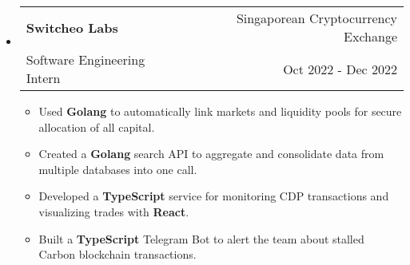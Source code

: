 \documentclass[letterpaper, 11pt]{article}
\makeatletter
\newcommand{\ResumeEntryTSDL}[4]{
  \vspace{1pt}\item
    \begin{tabular*}{\textwidth}[t]{l@{\extracolsep{\fill}}r} 
      \textbf{#1} & #2 \\
      #3 & #4 \\
    \end{tabular*}\vspace{-2.835pt} %
}
\newcommand{\ResumeItem}[2]{
  \item{
    \textbf{#1}{: #2 \vspace{-2.835pt}}
  }
}
\newcommand{\ResumeItemDefault}[1]{
  \item{
    #1 \vspace{-2.835pt}
  }
}
\newcommand{\ResumeEntryStart}{\begin{itemize}[leftmargin=0mm, label={}]}
\newcommand{\ResumeEntryEnd}{\end{itemize}\vspace{-2.835pt}} %
\newcommand{\ResumeItemListStart}{\begin{itemize}[leftmargin=5mm, label=$\bullet$, itemsep=1mm, parsep=1mm]} %
\newcommand{\ResumeItemListEnd}{\end{itemize}}
\makeatother
\begin{document}
  \ResumeEntryStart
    \ResumeEntryTSDL{Switcheo Labs}{Singaporean Cryptocurrency Exchange}{Software Engineering Intern}{Oct 2022 - Dec 2022}
    \ResumeItemListStart
    \ResumeItemDefault{Used \textbf{Golang} to automatically link markets and liquidity pools for secure allocation of all capital.}
    \ResumeItemDefault{Created a \textbf{Golang} search API to aggregate and consolidate data from multiple databases into one call.}
    \ResumeItemDefault{Developed a \textbf{TypeScript} service for monitoring CDP transactions and visualizing trades with \textbf{React}.}
    \ResumeItemDefault{Built a \textbf{TypeScript} Telegram Bot to alert the team about stalled Carbon blockchain transactions.}
    \ResumeItemListEnd
  \ResumeEntryEnd

\end{document}

